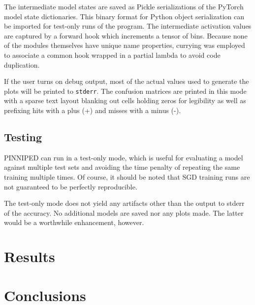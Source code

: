 \documentclass[10pt,epsf]{article}
\begin{document}
{{    The intermediate model states are saved as Pickle serializations of the PyTorch model state dictionaries.
    This binary format for Python object serialization can be imported for test-only runs of the program.
    The intermediate activation values are captured by a forward hook\autocite{torchactivations}
    which increments a tensor\autocite{torchtensors} of bins. Because none of the modules themselves
    have unique name properties, currying\autocite{functools} was employed to associate a common hook
    wrapped in a partial lambda to avoid code duplication.

    If the user turns on debug output, most of the actual values used to generate the plots will be printed
    to \texttt{stderr}. The confusion matrices are printed in this mode with a sparse text layout blanking
    out cells holding zeros for legibility as well as prefixing hits with a plus (+) and misses with a minus (-).
  }
  \subsection{Testing}{
    PINNIPED can run in a test-only mode, which is useful for evaluating a model against multiple test sets
    and avoiding the time penalty of repeating the same training multiple times. Of course, it should be noted
    that SGD training runs are not guaranteed to be perfectly reproducible.

    The test-only mode does not yield any artifacts other than the output to stderr of the accuracy. No
    additional models are saved nor any plots made. The latter would be a worthwhile enhancement, however.
  }
}
\section{Results}{
}
\section{Conclusions}{
}

\printbibliography
\end{document}
